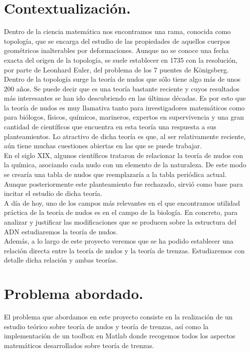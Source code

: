 \section{Contextualización.}
Dentro de la ciencia matemática nos encontramos una rama, conocida como topología, que se encarga del estudio de las propiedades de aquellos cuerpos geométricos inalterables por deformaciones. Aunque no se conoce una fecha exacta del origen de la topología, se suele establecer en 1735 con la resolución, por parte de Leonhard Euler, del problema de los 7 puentes de Königsberg.\\

Dentro de la topología surge la teoría de nudos que sólo tiene algo más de unos 200 años. Se puede decir que es una teoría bastante reciente y cuyos resultados más interesantes se han ido descubriendo en las últimas décadas. Es por esto que la teoría de nudos es muy llamativa tanto para investigadores matemáticos como para biólogos, físicos, químicos, marineros, expertos en supervivencia y una gran cantidad de científicos que encuentra en esta teoría una respuesta a sus planteamientos. Lo atractivo de dicha teoría es que, al ser relativamente reciente, aún tiene muchas cuestiones abiertas en las que se puede trabajar. \\

En el siglo XIX, algunos científicos trataron de relacionar la teoría de nudos con la química, asociando cada nudo con un elemento de la naturaleza. De este modo se crearía una tabla de nudos que reemplazaría a la tabla periódica actual. Aunque posteriormente este planteamiento fue rechazado, sirvió como base para incitar el estudio de dicha teoría. \\

A día de hoy, uno de los campos más relevantes en el que encontramos utilidad práctica de la teoría de nudos es en el campo de la biología. En concreto, para analizar y justificar las modificaciones que se producen sobre la estructura del ADN estudiaremos la teoría de nudos. \\

Además, a lo largo de este proyecto veremos que se ha podido establecer una relación directa entre la teoría de nudos y la teoría de trenzas. Estudiaremos con detalle dicha relación y ambas teorías. \\


 
\section{Problema abordado.}
El problema que abordamos en este proyecto consiste en la realización de un estudio teórico sobre teoría de nudos y teoría de trenzas, así como la implementación de un toolbox en Matlab donde recogemos todos los aspectos matemáticos desarrollados sobre teoría de trenzas. \\


